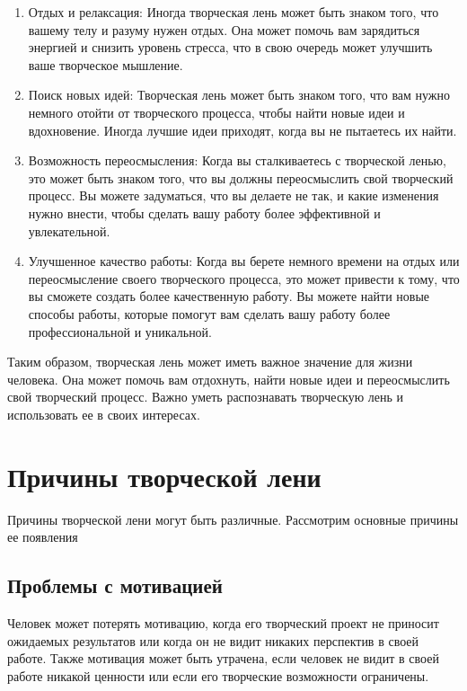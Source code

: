\documentclass[a4paper, 14pt]{article}
\begin{document}
\begin{enumerate}

\item Отдых и релаксация: Иногда творческая лень может быть знаком того, что вашему телу и разуму нужен отдых. Она может помочь вам зарядиться энергией и снизить уровень стресса, что в свою очередь может улучшить ваше творческое мышление.

\item Поиск новых идей: Творческая лень может быть знаком того, что вам нужно немного отойти от творческого процесса, чтобы найти новые идеи и вдохновение. Иногда лучшие идеи приходят, когда вы не пытаетесь их найти.

\item Возможность переосмысления: Когда вы сталкиваетесь с творческой ленью, это может быть знаком того, что вы должны переосмыслить свой творческий процесс. Вы можете задуматься, что вы делаете не так, и какие изменения нужно внести, чтобы сделать вашу работу более эффективной и увлекательной.

\item Улучшенное качество работы: Когда вы берете немного времени на отдых или переосмысление своего творческого процесса, это может привести к тому, что вы сможете создать более качественную работу. Вы можете найти новые способы работы, которые помогут вам сделать вашу работу более профессиональной и уникальной.

\end{enumerate}
Таким образом, творческая лень может иметь важное значение для жизни человека. Она может помочь вам отдохнуть, найти новые идеи и переосмыслить свой творческий процесс. Важно уметь распознавать творческую лень и использовать ее в своих интересах.


\section{Причины творческой лени}
Причины творческой лени могут быть различные. Рассмотрим основные причины ее появления

\subsection{Проблемы с мотивацией}
Человек может потерять мотивацию, когда его творческий проект не приносит ожидаемых результатов или когда он не видит никаких перспектив в своей работе. Также мотивация может быть утрачена, если человек не видит в своей работе никакой ценности или если его творческие возможности ограничены.
\end{document}
